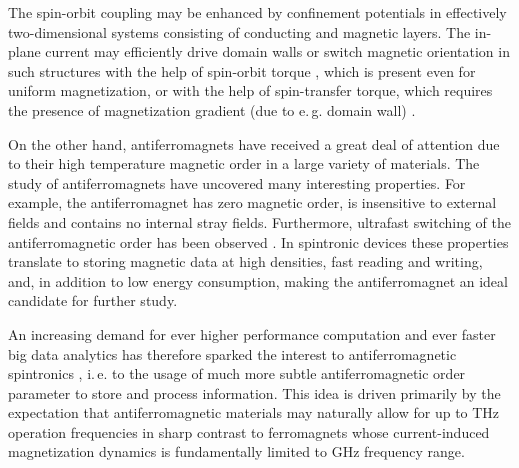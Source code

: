 The spin-orbit coupling may be enhanced by confinement potentials in effectively two-dimensional systems consisting of conducting and magnetic layers. The in-plane current may efficiently drive domain walls or switch magnetic orientation in such structures with the help of spin-orbit torque \cite{awschalom2009trend,manchon_theory_2008,garate_influence_2009,manchon2009theory}, which is present even for uniform magnetization, or with the help of spin-transfer torque, which requires the presence of magnetization gradient (due to e.\,g. domain wall) \cite{slonczewski_current-driven_1996,berger_emission_1996,ralph_spin_2008,stiles_anatomy_2002}. 

On the other hand, antiferromagnets have received a great deal of attention due to their high temperature magnetic order in a large variety of materials. The study of antiferromagnets have uncovered many interesting properties. For example, the antiferromagnet has zero magnetic order, is
insensitive to external fields and contains no internal stray fields.
Furthermore, ultrafast switching of the antiferromagnetic order has been observed \cite{?}. In
spintronic devices these properties translate to storing magnetic data at high densities, fast
reading and writing, and, in addition to low energy consumption, making the antiferromagnet an ideal
candidate for further study.

An increasing demand for ever higher performance computation and ever faster big data analytics has therefore sparked the interest to antiferromagnetic spintronics \cite{macdonald_antiferromagnetic_2011, gomonay_spintronics_2014, wadley_electrical_2016, jungwirth_antiferromagnetic_2016, baltz_antiferromagnetic_2018, jungwirth_multiple_2018, jungfleisch_perspectives_2018}, i.\,e. to the usage of much more subtle antiferromagnetic order parameter to store and process information. This idea is driven primarily by the expectation that antiferromagnetic materials may naturally allow for up to THz operation frequencies \cite{gomonay_high_2016, olejnik_terahertz_2018, jungwirth_multiple_2018, macdonald_antiferromagnetic_2011,gomonay_spintronics_2014,zelezny_relativistic_2014} in sharp contrast to ferromagnets whose current-induced magnetization dynamics is fundamentally limited to GHz frequency range. 
  

